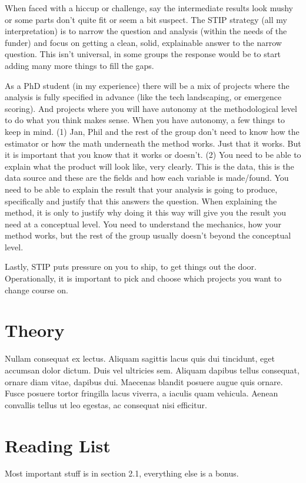 \documentclass[11pt,letterpaper]{article} %
\begin{document}
When faced with a hiccup or challenge, say the intermediate results look mushy or some parts don't quite fit or seem a bit suspect.  The STIP strategy (all my interpretation) is to narrow the question and analysis (within the needs of the funder) and focus on getting a clean, solid, explainable answer to the narrow question.  This isn't universal, in some groups the response would be to start adding many more things to fill the gaps.

As a PhD student (in my experience) there will be a mix of projects where the analysis is fully specified in advance (like the tech landscaping, or emergence scoring).  And projects where you will have autonomy at the methodological level to do what you think makes sense.  When you have autonomy, a few things to keep in mind.  (1) Jan, Phil and the rest of the group don't need to know how the estimator or how the math underneath the method works.  Just that it works.  But it is important that you know that it works or doesn't.  (2) You need to be able to explain what the product will look like, very clearly.  This is the data, this is the data source and these are the fields and how each variable is made/found.  You need to be able to explain the result that your analysis is going to produce, specifically and justify that this answers the question.  When explaining the method, it is only to justify why doing it this way will give you the result you need at a conceptual level.  You need to understand the mechanics, how your method works, but the rest of the group usually doesn't beyond the conceptual level.

Lastly, STIP puts pressure on you to ship, to get things out the door.  Operationally, it is important to pick and choose which projects you want to change course on.


\section*{Theory}
Nullam consequat ex lectus. Aliquam sagittis lacus quis dui tincidunt, eget accumsan dolor dictum. Duis vel ultricies sem. Aliquam dapibus tellus consequat, ornare diam vitae, dapibus dui. Maecenas blandit posuere augue quis ornare. Fusce posuere tortor fringilla lacus viverra, a iaculis quam vehicula. Aenean convallis tellus ut leo egestas, ac consequat nisi efficitur.
\clearpage
\section*{Reading List}
Most important stuff is in section 2.1, everything else is a bonus.  
\end{document}
